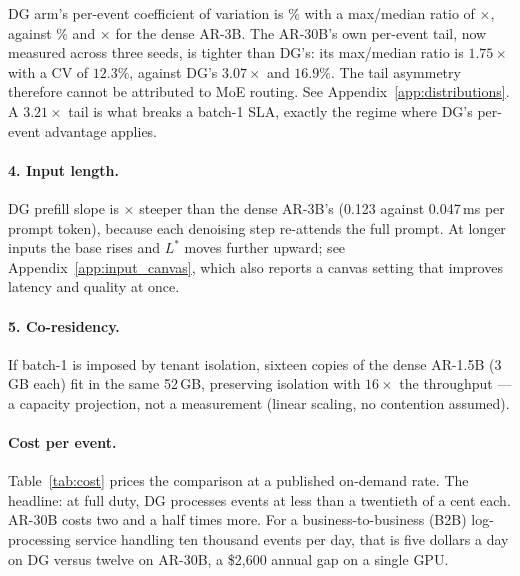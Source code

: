 DG arm's per-event coefficient of variation is \dgEventCV\%
with a max/median ratio of \dgMaxMed$\times$, against
\arEventCV\% and \arMaxMed$\times$ for the dense AR-3B. The AR-30B's
own per-event tail, now measured across three seeds, is tighter than
DG's: its max/median ratio is $1.75\times$ with a CV of $12.3\%$,
against DG's $3.07\times$ and $16.9\%$. The tail asymmetry therefore
cannot be attributed to MoE routing. See
Appendix~\ref{app:distributions}.
A $3.21\times$ tail is what breaks a batch-1 SLA, exactly the
regime where DG's per-event advantage applies.

\paragraph{4. Input length.}

DG prefill slope is $\times$ steeper than
the dense AR-3B's (0.123 against 0.047\,ms per prompt token), because
each denoising step re-attends the full prompt. At
longer inputs the base rises and $L^{*}$ moves further upward; see
Appendix~\ref{app:input_canvas}, which also reports a canvas setting
that improves latency and quality at once.

\paragraph{5. Co-residency.}

If batch-1 is imposed by tenant isolation, sixteen copies of the
dense AR-1.5B (3\,GB each) fit in the same 52\,GB, preserving
isolation with $16\times$ the throughput --- a capacity projection,
not a measurement (linear scaling, no contention assumed).

\paragraph{Cost per event.}

Table~\ref{tab:cost} prices the comparison at a published on-demand
rate. The headline: at full duty, DG processes events at less than a
twentieth of a cent each. AR-30B costs two and a half times more. For a
business-to-business (B2B) log-processing service handling ten
thousand events per day, that is five dollars a day on DG versus
twelve on AR-30B, a \$2{,}600 annual gap on a single GPU.

